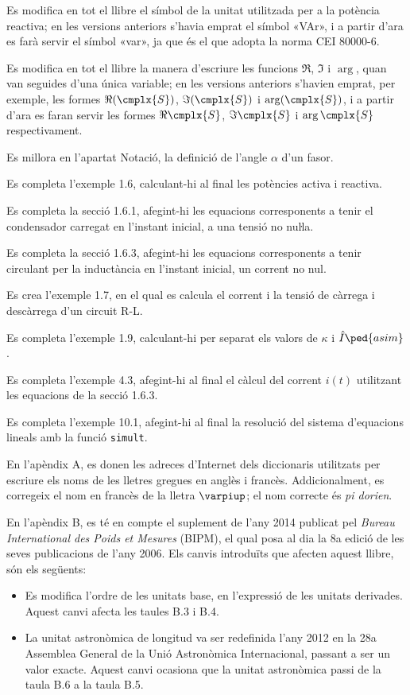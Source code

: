 Es modifica en tot el llibre el símbol de la unitat  utilitzada per a la potència reactiva; en les versions anteriors s'havia emprat el símbol «VAr», i a partir d'ara es farà servir el símbol «var», ja que és el que adopta la norma CEI 80000-6.

Es modifica en tot el llibre la manera d'escriure les funcions $\Re$, $\Im$ i $\arg$, quan van seguides d'una única variable; en les versions anteriors s'havien emprat, per exemple, les formes $\Re(\cmplx{S})$, $\Im(\cmplx{S})$ i $\arg(\cmplx{S})$, i a partir d'ara es faran servir les formes $\Re\cmplx{S}$, $\Im\cmplx{S}$ i $\arg\cmplx{S}$ respectivament.


Es millora en l’apartat Notació, la definició de l’angle $\alpha$ d’un fasor.


Es completa l'exemple 1.6, calculant-hi al final les potències activa i reactiva.

Es completa la secció 1.6.1, afegint-hi les equacions corresponents a tenir el condensador carregat en l'instant inicial, a una tensió no nuŀla.

Es completa la secció 1.6.3, afegint-hi les equacions corresponents a tenir circulant per la inductància en l'instant  inicial, un corrent no nul.

Es crea l'exemple 1.7, en el qual es calcula el corrent i la tensió de càrrega i descàrrega d'un circuit R-L.

Es completa l'exemple 1.9, calculant-hi per separat els valors de $\kappa$ i $\hat{I}\ped{asim}$.


Es completa l'exemple 4.3, afegint-hi al final el càlcul del corrent $i(t)$ utilitzant les equacions de la secció 1.6.3.

Es completa l'exemple 10.1, afegint-hi al final la resolució del sistema d'equacions lineals amb la funció \texttt{simult}.


En l'apèndix A, es donen les adreces d'Internet dels diccionaris utilitzats per escriure els noms de les lletres gregues en anglès i francès. Addicionalment, es corregeix el nom en francès de la lletra $\varpiup$; el nom correcte és \textit{pi dorien}.

En l'apèndix B, es té en compte el suplement de l'any 2014 publicat pel  \textit{Bureau International des Poids et Mesures} (BIPM), el qual posa al dia la 8a edició de les seves publicacions de l'any 2006. Els canvis introduïts que afecten aquest llibre, són els següents:
\begin{itemize}
  \item Es modifica l'ordre de les unitats base, en l'expressió de les unitats derivades. Aquest canvi afecta les taules B.3 i B.4.
  \item La unitat astronòmica de longitud va ser redefinida l'any 2012 en la 28a Assemblea General de la Unió Astronòmica Internacional, passant a ser un valor exacte. Aquest canvi ocasiona que la unitat astronòmica passi de la taula B.6  a la taula  B.5.
\end{itemize}

